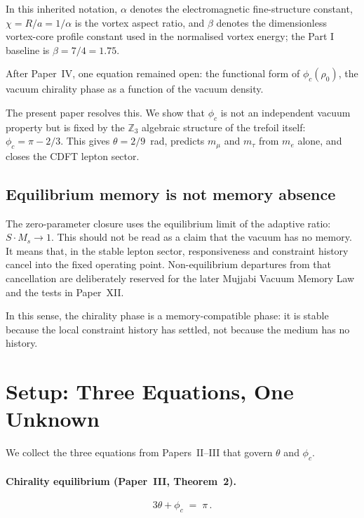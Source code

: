 \documentclass[11pt]{article}
\begin{document}
In this inherited notation, $\alpha$ denotes the electromagnetic
fine-structure constant, $\chi=R/a=1/\alpha$ is the vortex aspect ratio, and
$\beta$ denotes the dimensionless vortex-core profile constant used in the
normalised vortex energy; the Part I baseline is $\beta=7/4=1.75$.

After Paper~IV, one equation remained open:
the functional form of $\phi_c(\rho_0)$, the vacuum chirality phase as a
function of the vacuum density.

The present paper resolves this.
We show that $\phi_c$ is not an independent vacuum property but is fixed by
the $\mathbb{Z}_3$ algebraic structure of the trefoil itself:
$\phi_c = \pi - 2/3$.
This gives $\theta = 2/9$~rad, predicts $m_\mu$ and $m_\tau$ from $m_e$ alone,
and closes the CDFT lepton sector.

\subsection{Equilibrium memory is not memory absence}

The zero-parameter closure uses the equilibrium limit of the adaptive ratio:
$S\cdot M_s\rightarrow1$. This should not be read as a claim that the vacuum has
no memory. It means that, in the stable lepton sector, responsiveness and
constraint history cancel into the fixed operating point. Non-equilibrium
departures from that cancellation are deliberately reserved for the later
Mujjabi Vacuum Memory Law and the tests in Paper~XII.

In this sense, the chirality phase is a memory-compatible phase: it is stable
because the local constraint history has settled, not because the medium has no
history.


\section{Setup: Three Equations, One Unknown}
\label{sec:setup}

We collect the three equations from Papers~II--III that govern $\theta$ and
$\phi_c$.

\paragraph{Chirality equilibrium (Paper~III, Theorem~2).}
\begin{equation}
  3\theta + \phi_c \;=\; \pi\,.
  \label{eq:equil}
\end{equation}
\end{document}
